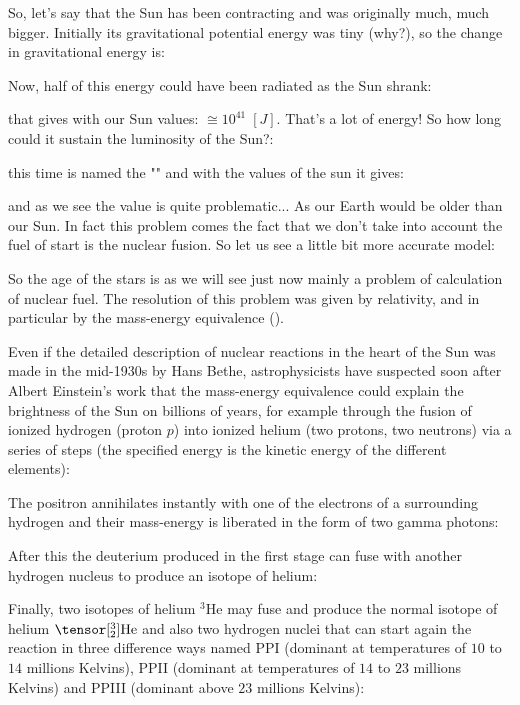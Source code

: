 	So, let's say that the Sun has been contracting and was originally much, much bigger.  Initially its gravitational potential energy was tiny (why?), so the change in gravitational energy is:
	
	Now, half of this energy could have been radiated as the Sun shrank:
	
	that gives with our Sun values: $\cong 10^{41}\;[J]$. That's a lot of energy! So how long could it sustain the luminosity of the Sun?:
	
	this time is named the "" and with the values of the sun it gives:
	
	and as we see the value is quite problematic... As our Earth would be older than our Sun. In fact this problem comes the fact that we don't take into account the fuel of start is the nuclear fusion. So let us see a little bit more accurate model:
	
	So the age of the stars is as we will see just now mainly a problem of calculation of nuclear fuel. The resolution of this problem was given by relativity, and in particular by the mass-energy equivalence ().

	Even if the detailed description of nuclear reactions in the heart of the Sun was made in the mid-1930s by Hans Bethe, astrophysicists have suspected soon after Albert Einstein's work that the mass-energy equivalence could explain the brightness of the Sun on billions of years, for example through the fusion of ionized hydrogen (proton $p$) into ionized helium (two protons, two neutrons) via a series of steps (the specified energy is the kinetic energy of the different elements):
	
	The positron annihilates instantly with one of the electrons of a surrounding hydrogen and their mass-energy is liberated in the form of two gamma photons:
	
	After this the deuterium produced in the first stage can fuse with another hydrogen nucleus to produce an isotope of helium:
	
	Finally, two isotopes of helium $^3\mathrm{He}$  may fuse and produce the normal isotope of helium $\tensor[^{3}_2]{\mathrm{He}}{}$ and also two hydrogen nuclei that can start again the reaction in three difference ways named PPI (dominant at temperatures of $10$ to $14$ millions Kelvins), PPII (dominant at temperatures of $14$ to $23$ millions Kelvins) and PPIII (dominant above $23$ millions Kelvins):
	
